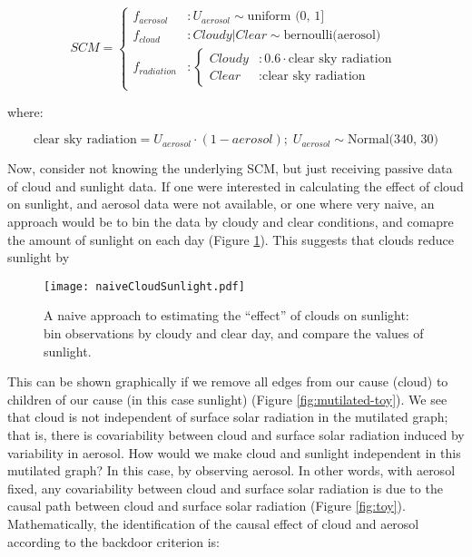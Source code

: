 \documentclass[12pt]{article}
\begin{document}
\begin{equation}
  SCM =
  \begin{cases}
    f_{aerosol} &: U_{aerosol} \sim \text{uniform (0, 1]}\\
    f_{cloud} &: Cloudy | Clear \sim \text{bernoulli(aerosol)}     \\
    f_{radiation} &: \begin{cases}
      Cloudy &: 0.6 \cdot \text{clear sky radiation}  \\
      Clear &: \text{clear sky radiation}
    \end{cases}
  \end{cases}
\end{equation}

where:

\begin{equation*}
  \text{clear sky radiation} = U_{aerosol} \cdot (1 - aerosol); \;
  U_{aerosol} \sim \text{Normal(340, 30)}
\end{equation*}

Now, consider not knowing the underlying SCM, but just receiving
passive data of cloud and sunlight data. If one were interested in
calculating the effect of cloud on sunlight, and aerosol data were not
available, or one where very naive, an approach would be to bin the
data by cloudy and clear conditions, and comapre the amount of
sunlight on each day (Figure \ref{fig:naive-cloud-sunlight}). This
suggests that clouds reduce sunlight by %

\begin{figure}
  \texttt{[image: naiveCloudSunlight.pdf]}
  \caption{A naive approach to estimating the ``effect'' of clouds on
    sunlight: bin observations by cloudy and clear day, and compare
    the values of sunlight.}
  \label{fig:naive-cloud-sunlight}
\end{figure}

This can be shown graphically if
we remove all edges from our cause (cloud) to children of our cause
(in this case sunlight) (Figure \ref{fig:mutilated-toy}). We see that
cloud is not independent of surface solar radiation in the mutilated
graph; that is, there is covariability between cloud and surface solar
radiation induced by variability in aerosol.  How would we make cloud
and sunlight independent in this mutilated graph?  In this case, by
observing aerosol. In other words, with aerosol fixed, any
covariability between cloud and surface solar radiation is due to the
causal path between cloud and surface solar radiation (Figure
\ref{fig:toy}).  Mathematically, the identification of the causal
effect of cloud and aerosol according to the backdoor criterion is:
\end{document}
